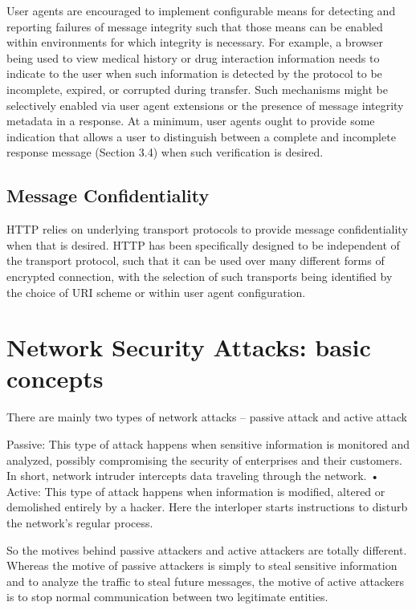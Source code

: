 User agents are encouraged to implement configurable means for
detecting and reporting failures of message integrity such that those
means can be enabled within environments for which integrity is
necessary.  For example, a browser being used to view medical history
or drug interaction information needs to indicate to the user when
such information is detected by the protocol to be incomplete,
expired, or corrupted during transfer.  Such mechanisms might be
selectively enabled via user agent extensions or the presence of
message integrity metadata in a response.  At a minimum, user agents
ought to provide some indication that allows a user to distinguish
between a complete and incomplete response message (Section 3.4) when
such verification is desired.

\subsection{Message Confidentiality}

HTTP relies on underlying transport protocols to provide message
confidentiality when that is desired.  HTTP has been specifically
designed to be independent of the transport protocol, such that it
can be used over many different forms of encrypted connection, with
the selection of such transports being identified by the choice of
URI scheme or within user agent configuration.

\section{Network Security Attacks: basic concepts}
There are mainly two types of network attacks – passive attack and active attack

Passive: This type of attack happens when sensitive information is monitored and
analyzed, possibly compromising the security of enterprises and their customers.
In short, network intruder intercepts data traveling through the network.
• Active: This type of attack happens when information is modified, altered or
demolished entirely by a hacker. Here the interloper starts instructions to disturb
the network’s regular process.

So the motives behind passive attackers and active attackers are totally different.
Whereas the motive of passive attackers is simply to steal sensitive information and
to analyze the traffic to steal future messages, the motive of active attackers is to stop
normal communication between two legitimate entities.
